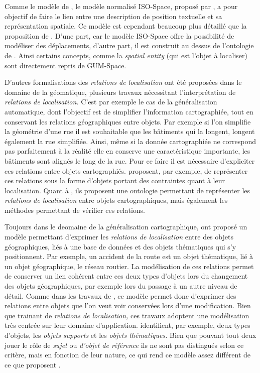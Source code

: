 Comme le modèle de \textcite{Vasardini2013}, le modèle normalisé
ISO-Space, proposé par \textcite{Pustejovsky2017}, a pour objectif de
faire le lien entre une description de position textuelle et sa
représentation spatiale. Ce modèle est cependant beaucoup plus
détaillé que la proposition de \textcite{Vasardini2013}. D'une part,
car le modèle ISO-Space offre la possibilité de modéliser des
déplacements, d'autre part, il est construit au dessus de l'ontologie
de \textcite{Bateman2010}. Ainsi certains concepts, comme la
\emph{spatial entity} (qui est l'objet à localiser) sont directement
repris de GUM-Space.

D'autres formalisations des \emph{relations de localisation} ont été
proposées dans le domaine de la géomatique, plusieurs travaux
nécessitant l'interprétation de \emph{relations de localisation.}
C'est par exemple le cas de la généralisation automatique, dont
l'objectif est de simplifier l'information cartographiée, tout en
conservant les relations géographiques entre objets. Par exemple si
l'on simplifie la géométrie d'une rue il est souhaitable que les
bâtiments qui la longent, longent également la rue simplifiée. Ainsi,
même si la donnée cartographiée ne correspond pas parfaitement à la
réalité elle en conserve une caractéristique importante, les bâtiments
sont alignés le long de la rue. Pour ce faire il est nécessaire
d'expliciter ces relations entre objets
cartographiés. \textcite{Duchene2004,Gaffuri2008} proposent, par
exemple, de représenter ces relations sous la forme d'objets portant
des contraintes quant à leur localisation. Quant à
\textcite{Touya2012}, ils proposent une ontologie permettant de
représenter les \emph{relations de localisation} entre objets
cartographiques, mais également les méthodes permettant de vérifier
ces relations.

Toujours dans le deomaine de la généralisation cartographique,
\textcite{Jaara2012} ont proposé un modèle permettant d'exprimer les
\emph{relations de localisation} entre des objets géographiques, liés
à une base de données et des objets thématiques qui s'y
positionnent. Par exemple, un accident de la route est un objet
thématique, lié à un objet géographique, le réseau routier. La
modélisation de ces relations permet de conserver un lien cohérent
entre ces deux types d'objets lors du changement des objets
géographiques, par exemple lors du passage à un autre niveau de
détail. Comme dans les travaux de \textcite{Duchene2004,Gaffuri2008,
  Touya2012}, ce modèle permet donc d'exprimer des relations entre
objets que l'on veut voir conservées lors d'une modification. Bien que
trainant de \emph{relations de localisation,} ces travaux adoptent une
modélisation très centrée sur leur domaine
d’application. \textcite{Jaara2012} identifient, par exemple, deux
types d'objets, les \emph{objets supports} et les \emph{objets
  thématiques.} Bien que pouvant tout deux jouer le rôle de
\emph{sujet} ou \emph{d'objet de référence} ils ne sont pas distingués
selon ce critère, mais en fonction de leur nature, ce qui rend ce
modèle assez différent de ce que proposent
\textcite{Bateman2010,Pustejovsky2017}.


